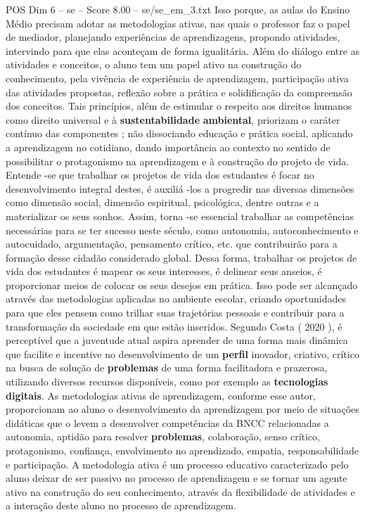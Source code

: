 \begin{textsample}{POS Dim 6 – se – Score 8.00 – se/se\_em\_3.txt}
Isso porque, as aulas do Ensino Médio precisam adotar as metodologias ativas, nas quais o professor faz o papel de mediador, planejando experiências de aprendizagens, propondo atividades, intervindo para que elas aconteçam de forma igualitária.
Além do diálogo entre as atividades e conceitos, o aluno tem um papel ativo na construção do conhecimento, pela vivência de experiência de aprendizagem, participação ativa das atividades propostas, reflexão sobre a prática e solidificação da compreensão dos conceitos.
Tais princípios, além de estimular o respeito aos direitos humanos como direito universal e à \textbf{sustentabilidade} \textbf{ambiental}, priorizam o caráter contínuo das componentes ; não dissociando educação e prática social, aplicando a aprendizagem no cotidiano, dando importância ao contexto no sentido de possibilitar o protagonismo na aprendizagem e à construção do projeto de vida.
Entende -se que trabalhar os projetos de vida dos estudantes é focar no desenvolvimento integral destes, é auxiliá -los a progredir nas diversas dimensões como dimensão social, dimensão espiritual, psicológica, dentre outras e a materializar os seus sonhos.
Assim, torna -se essencial trabalhar as competências necessárias para se ter sucesso neste século, como autonomia, autoconhecimento e autocuidado, argumentação, pensamento crítico, etc. que contribuirão para a formação desse cidadão considerado global.
Dessa forma, trabalhar os projetos de vida dos estudantes é mapear os seus interesses, é delinear seus anseios, é proporcionar meios de colocar os seus desejos em prática.
Isso pode ser alcançado através das metodologias aplicadas no ambiente escolar, criando oportunidades para que eles pensem como trilhar suas trajetórias pessoais e contribuir para a transformação da sociedade em que estão inseridos.
Segundo Costa ( 2020 ), é perceptível que a juventude atual aspira aprender de uma forma mais dinâmica que facilite e incentive no desenvolvimento de um \textbf{perfil} inovador, criativo, crítico na busca de solução de \textbf{problemas} de uma forma facilitadora e prazerosa, utilizando diversos recursos disponíveis, como por exemplo as \textbf{tecnologias} \textbf{digitais}.
As metodologias ativas de aprendizagem, conforme esse autor, proporcionam ao aluno o desenvolvimento da aprendizagem por meio de situações didáticas que o levem a desenvolver competências da BNCC relacionadas a autonomia, aptidão para resolver \textbf{problemas}, colaboração, senso crítico, protagonismo, confiança, envolvimento no aprendizado, empatia, responsabilidade e participação.
A metodologia ativa é um processo educativo caracterizado pelo aluno deixar de ser passivo no processo de aprendizagem e se tornar um agente ativo na construção do seu conhecimento, através da flexibilidade de atividades e a interação deste aluno no processo de aprendizagem.

\end{textsample}

